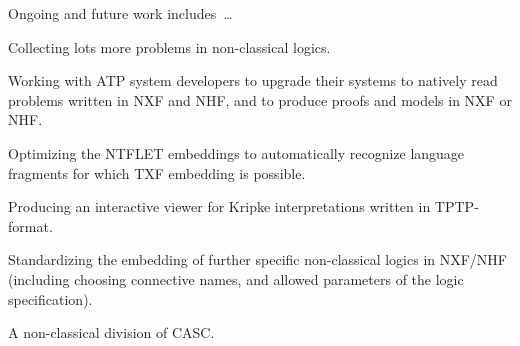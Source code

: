 \documentclass{ceurart}
\newenvironment{packed_itemize}{
\vspace*{-0.5em}
\begin{itemize}
\setlength{\partopsep}{0pt}
\setlength{\itemsep}{1pt}
\setlength{\parskip}{0pt}
\setlength{\parsep}{0pt}
}{\end{itemize}}
\begin{document}
Ongoing and future work includes~\ldots
\begin{packed_itemize}
\item Collecting lots more problems in non-classical logics.
\item Working with ATP system developers to upgrade their systems to natively read problems 
      written in NXF and NHF, and to produce proofs and models in NXF or NHF.
\item Optimizing the NTFLET embeddings to automatically recognize language fragments for which
      TXF embedding is possible.
\item Producing an interactive viewer for Kripke interpretations written in TPTP-format.
\item Standardizing the embedding of further specific non-classical logics in NXF/NHF (including
      choosing connective names, and allowed parameters of the logic specification).
\item A non-classical division of CASC.
\end{packed_itemize}

% 

\end{document}
